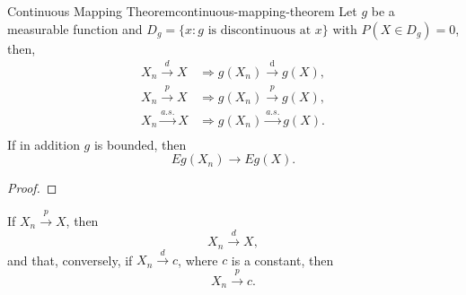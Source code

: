 \begin{theorem}{Continuous Mapping Theorem}{continuous-mapping-theorem}
    Let $g$ be a measurable function and $D_g=\{x:g \text{ is discontinuous at } x\}$ with $P(X\in D_g)=0$, then,
    \begin{equation}
        \begin{aligned}
            X_{n} \stackrel{d}{\rightarrow} X    & \Rightarrow g\left(X_{n}\right) \stackrel{\mathrm{d}}{\rightarrow} g(X), \\
            X_{n} \stackrel{p}{\rightarrow} X    & \Rightarrow g\left(X_{n}\right) \stackrel{p}{\rightarrow} g(X),          \\
            X_{n} \stackrel{a.s.}{\rightarrow} X & \Rightarrow g\left(X_{n}\right) \stackrel{a.s.}{\rightarrow} g(X).       \\
        \end{aligned}
    \end{equation}
    If in addition $g$ is bounded, then
    \begin{equation}
        Eg(X_n)\rightarrow Eg(X).
    \end{equation}
\end{theorem}

\begin{proof}

\end{proof}

\begin{theorem}{}{}
    If $X_{n}\stackrel{p}{\rightarrow}X$, then
    \begin{equation}
        X_{n}\stackrel{d}{\rightarrow}X,
    \end{equation}
    and that, conversely, if $X_{n}\stackrel{d}{\rightarrow}c$, where $c$ is a constant, then
    \begin{equation}
        X_{n}\stackrel{p}{\rightarrow}c.
    \end{equation}
\end{theorem}


